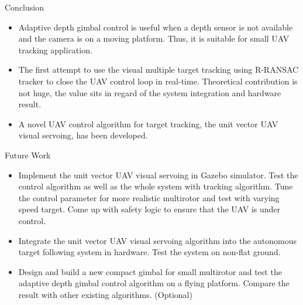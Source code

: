 \documentclass[9pt]{beamer}
\begin{document}
\begin{frame}{Conclusion}
\begin{itemize}
	\item Adaptive depth gimbal control is useful
	when a depth sensor is not available and the camera is on a moving platform. Thus, it is suitable for small UAV tracking application.
	\item The first attempt to use the visual multiple target tracking using R-RANSAC tracker to close the UAV control loop in real-time. Theoretical contribution is not huge, the value sits in regard of the system integration and hardware result.
	\item A novel UAV control algorithm for target tracking, the unit vector UAV visual servoing, has been developed.
\end{itemize}
\end{frame}

\begin{frame}{Future Work}
\begin{itemize}
	\item Implement the unit vector UAV visual servoing in Gazebo simulator. Test the control algorithm as well as the whole system with tracking algorithm. Tune the control parameter for more realistic multirotor and test with varying speed target. Come up with safety logic to ensure that the UAV is under control.
	\item Integrate the unit vector UAV visual servoing algorithm into the autonomous target following system in hardware. Test the system on non-flat ground. 
	\item Design and build a new compact gimbal for small multirotor and test the adaptive depth gimbal control algorithm on a flying platform. Compare the result with other existing algorithms. (Optional)
\end{itemize}
\end{frame}
\end{document}
